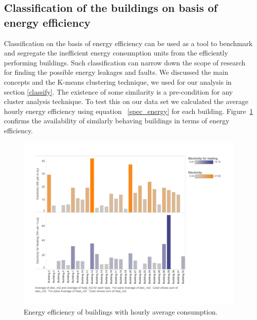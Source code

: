 \subsection{Classification of the buildings on basis of energy efficiency}
Classification on the basis of energy efficiency can be used as a tool to benchmark and segregate the inefficient energy consumption units from the efficiently performing buildings. Such classification can narrow down the scope of research for finding the possible energy leakages and faults. We discussed the main concepts and the K-means clustering technique, we used for our analysis in section \ref{classify}. The existence of some similarity is a pre-condition for any cluster analysis technique. To test this on our data set we calculated the average hourly energy efficiency using equation ~\ref{spec_energy} for each building. Figure~\ref{fig:hr_m2} confirms the availability of similarly behaving buildings in terms of energy efficiency. 
\begin{figure}[!ht]
    \begin{center}
      \includegraphics[scale = 0.6]{images/hr_m2.pdf}
      \caption{Energy efficiency of buildings with hourly average consumption.}
      \label{fig:hr_m2}
    \end{center}
\end{figure} 

